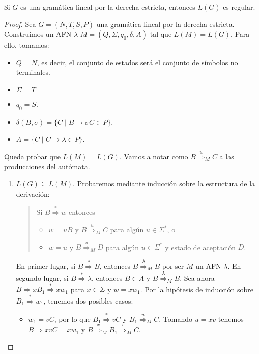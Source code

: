 \begin{lema}\label{lem:gl-r}Si $G$ es una gramática lineal por la derecha estricta, entonces $L(G)$ es regular.
\end{lema}
\begin{proof}
Sea $G=(N,T,S,P)$ una gramática lineal por la derecha estricta. Construimos un AFN-$\lambda$ 
$M=(Q,\Sigma,q_0,\delta,A)$ tal que $L(M)=L(G)$. Para ello, tomamos:
\begin{itemize}
    \item $Q=N$, es decir, el conjunto de estados será el conjunto de símbolos no terminales.
    \item $\Sigma=T$
    \item $q_0=S$.
    \item $\delta(B,\sigma)=\{C\mid B\to\sigma C\in P\}$.
    \item $A=\{C\mid C\to\lambda\in P\}$.
\end{itemize}
Queda probar que $L(M)=L(G)$. Vamos a notar como $B\overset{w}{\Rightarrow}_MC$ a las producciones del autómata.
\begin{enumerate}
    \item $L(G)\subseteq L(M)$. Probaremos mediante inducción sobre la estructura de la derivación:
    \begin{quote}
        Si $B\overset{*}{\Rightarrow}w$ entonces
        \begin{itemize}
            \item $w=uB$ y $B\overset{u}{\Rightarrow}_MC$ para algún $u\in\Sigma^*$, o
            \item $w=u$ y $B\overset{u}{\Rightarrow}_MD$ para algún $u\in\Sigma^*$ y estado de aceptación $D$.
        \end{itemize}
    \end{quote}
    En primer lugar, si $B\overset{*}{\Rightarrow}B$, entonces $B\overset{\lambda}{\Rightarrow}_MB$ por ser $M$ un 
    AFN-$\lambda$. En segundo lugar, si $B\overset{*}{\Rightarrow}\lambda$, entonces $B\in A$ y 
    $B\overset{\lambda}{\Rightarrow}_MB$. Sea ahora $B\Rightarrow xB_1\overset{*}{\Rightarrow}xw_1$ para $x\in\Sigma$ y $w=xw_1$. Por la hipótesis de inducción sobre $B_1\overset{*}{\Rightarrow}w_1$, tenemos dos posibles casos:
    \begin{itemize}
        \item $w_1=vC$, por lo que $B_1\overset{*}{\Rightarrow}vC$ y $B_1\overset{u}{\Rightarrow}_MC$. Tomando $u=xv$
        tenemos $B\Rightarrow xvC=xw_1$ y $B\overset{x}{\Rightarrow}_MB_1\overset{v}{\Rightarrow}_MC$.

\end{itemize}
\end{enumerate}
\end{proof}
